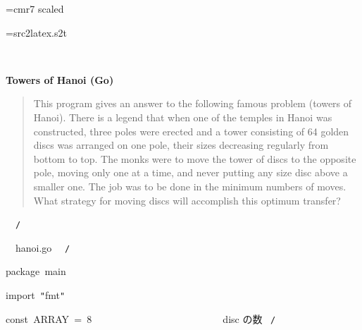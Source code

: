 \documentclass{article}
\begin{document}
\ifx\sevenrm\undefined
  \font\sevenrm=cmr7 scaled 
\fi

\newread\MyStyle
\openin\MyStyle=src2latex.s2t
\ifeof\MyStyle
  \closein\MyStyle
\else
  
  \closein\MyStyle
\fi

\def\mc{\relax}
\def\gt{\relax}
\def\sc{\scshape}

\tt\mc 

\noindent
\rm\mc {\tt /}{\tt *}\  \hrulefill \rm\mc \ {\tt *}

\noindent
\mbox{}\hfill

\noindent
\mbox{}\hfill

\noindent
\mbox{} {}%

\centerline{\bf Towers of Hanoi (Go)}

\begin{quote}

This program gives an answer to the following famous problem (towers of
Hanoi).
There is a legend that when one of the temples in Hanoi was constructed,
three poles were erected and a tower consisting of 64 golden discs was
arranged on one pole, their sizes decreasing regularly from bottom to top.
The monks were to move the tower of discs to the opposite pole, moving
only one at a time, and never putting any size disc above a smaller one.
The job was to be done in the minimum numbers of moves. What strategy for
moving discs will accomplish this optimum transfer?
\end{quote}


\noindent
\mbox{}\hfill

\noindent
\mbox{}{\tt *}\  \hrulefill \rm\mc \ {\tt *}{\tt /}
\tt\mc 

\noindent
\mbox{}\hfill

\noindent
\mbox{}\hfill

\noindent
\mbox{}\rm\mc {\tt /}{\tt *}\  \hrulefill\ hanoi.go \ \hrulefill \rm\mc \ {\tt *}{\tt /}
\tt\mc 

\noindent
\mbox{}\hfill

\noindent
\mbox{}package{\tt\mc \ }main

\noindent
\mbox{}\hfill

\noindent
\mbox{}import{\tt\mc \ }{\tt "}fmt{\tt "}

\noindent
\mbox{}\hfill

\noindent
\mbox{}const{\tt\mc \ }ARRAY{\tt\mc \ }={\tt\mc \ }8{\tt\mc \ }{\tt\mc \ \ \ \ \ \ \ \ }{\tt\mc \ \ \ \ \ \ \ \ }{\tt\mc \ \ \ \ \ \ \ \ }\rm\mc {\tt /}{\tt *}\  {}disc の数 \hfill \rm\mc \ {\tt *}{\tt /}
\tt\mc 
\end{document}
